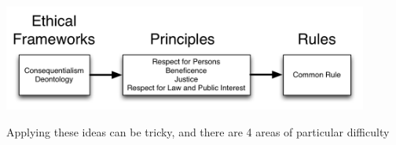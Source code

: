\documentclass{beamer}
\begin{document}
\begin{frame}

\begin{center}
\includegraphics[width=0.9\textwidth]{figures/ethics_schematic_simple.png}
\end{center}

\end{frame}
\begin{frame}

Applying these ideas can be tricky, and there are 4 areas of particular difficulty

\end{frame}
\end{document}
